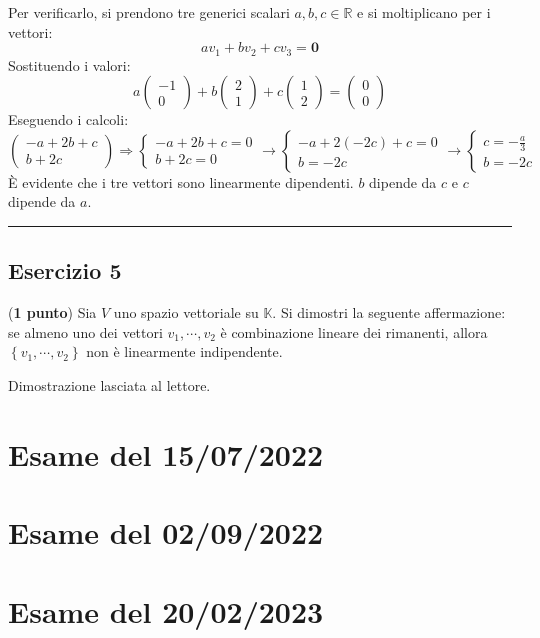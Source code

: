 \documentclass[a4paper]{article}
\newcommand{\longline}{\noindent\rule{\textwidth}{0.4pt}}
\begin{document}
	\noindent
	Per verificarlo, si prendono tre generici scalari $a,b,c \in \mathbb{R}$ e si moltiplicano per i vettori:
	\begin{equation*}
		av_{1} + bv_{2} + cv_{3} = \mathbf{0}
	\end{equation*}
	Sostituendo i valori:
	\begin{equation*}
		a
		\begin{pmatrix}
			-1 \\ 0
		\end{pmatrix}
		+ b
		\begin{pmatrix}
			2 \\ 1
		\end{pmatrix}
		+ c
		\begin{pmatrix}
			1 \\ 2
		\end{pmatrix}
		=
		\begin{pmatrix}
			0 \\ 0
		\end{pmatrix}
	\end{equation*}
	Eseguendo i calcoli:
	\begin{equation*}
		\begin{pmatrix}
			-a + 2b + c \\
			b + 2c
		\end{pmatrix} \Longrightarrow
		\begin{cases}
			-a + 2b + c = 0 \\
			b + 2c = 0
		\end{cases} \longrightarrow
		\begin{cases}
			-a + 2\left(-2c\right) + c = 0 \\
			b = -2c
		\end{cases} \longrightarrow
		\begin{cases}
			c = -\frac{a}{3} \\
			b = -2c
		\end{cases}
	\end{equation*}
	È evidente che i tre vettori sono linearmente dipendenti. $b$ dipende da $c$ e $c$ dipende da $a$.

	\longline

	\subsection{Esercizio 5}

	(\textbf{1 punto}) Sia $V$ uno spazio vettoriale su $\mathbb{K}$. Si dimostri la seguente affermazione: se almeno uno dei vettori $v_{1}, \cdots, v_{2}$ è combinazione lineare dei rimanenti, allora $\left\{v_{1}, \cdots, v_{2}\right\}$ non è linearmente indipendente.\newline

	\noindent
	Dimostrazione lasciata al lettore.\newpage

	\section{Esame del 15/07/2022}
	
	\newpage
	\section{Esame del 02/09/2022}
	
	\newpage
	\section{Esame del 20/02/2023}
\end{document}
